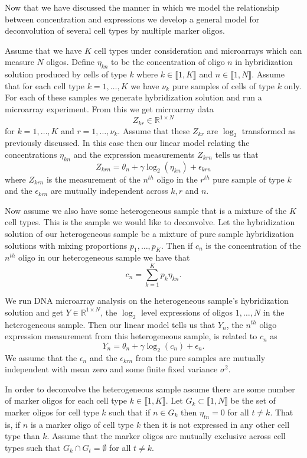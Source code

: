 \documentclass[reqno,12pt,oneside]{report}\usepackage[]{graphicx}\usepackage[]{color}
\theoremstyle{plain}
\theoremstyle{definition}
\theoremstyle{remark}
\numberwithin{theorem}{chapter}     %
\begin{document}
Now that we have discussed the manner in which we model the relationship between concentration and expressions we  develop a general model for deconvolution of several cell types by multiple marker oligos. 

Assume that we have $K$ cell types under consideration and microarrays which can measure $N$ oligos. Define $\eta_{kn}$ to be the concentration of oligo $n$ in hybridization solution produced by cells of type $k$ where $k\in\llbracket 1,K\rrbracket$ and $n\in\llbracket 1,N\rrbracket$. Assume that for each cell type $k=1,\ldots,K$ we have $\nu_k$ pure samples of cells of type $k$ only. For each of these samples we generate hybridization solution and run a microarray experiment. From this we get microarray data 
\[
Z_{kr} \in \mathbb{R}^{1\times N}
\]
for $k=1,\ldots,K$ and $r=1,\ldots,\nu_k$. Assume that these $Z_{kr}$ are $\log_2$ transformed as previously discussed. In this case then our linear model relating the concentrations $\eta_{kn}$ and the expression measurements $Z_{krn}$ tells us that
\[
Z_{krn} = \theta_n + \gamma \log_2\left(\eta_{kn}\right)+\epsilon_{krn}
\]
where $Z_{krn}$ is the measurement of the $n^{th}$ oligo in the $r^{th}$ pure sample of type $k$ and the $\epsilon_{krn}$ are mutually independent across $k,r$ and $n$.

Now assume we also have some heterogeneous sample that is a mixture of the $K$ cell types. This is the sample we would like to deconvolve. Let the hybridization solution of our heterogeneous sample be a mixture of pure sample hybridization solutions with mixing proportions $p_1,\ldots,p_K$. Then if $c_n$ is the concentration of the $n^{th}$ oligo in our heterogeneous sample we have that 
\[
c_n = \sum_{k=1}^{K}p_k\eta_{kn}.
\]

We run DNA microarray analysis on the heterogeneous sample's hybridization solution and get $Y\in\mathbb{R}^{1\times N}$, the $\log_2$ level expressions of oligos $1,\ldots,N$ in the heterogeneous sample. Then our linear model tells us that $Y_n$, the $n^{th}$ oligo expression measurement from this heterogeneous sample, is related to $c_n$ as
\[
Y_n = \theta_n + \gamma\log_2\left(c_n\right)+\epsilon_n.
\]
We assume that the $\epsilon_n$ and the $\epsilon_{krn}$ from the pure samples are mutually independent with mean zero and some finite fixed variance $\sigma^2$.

In order to deconvolve the heterogeneous sample assume there are some number of marker oligos for each cell type $k\in\llbracket1, K\rrbracket$. Let $G_k\subset\llbracket 1, N\rrbracket$ be the set of marker oligos for cell type $k$ such that if $n \in G_k$ then $\eta_{tn}=0$ for all $t \neq k$. That is, if $n$ is a marker oligo of cell type $k$ then it is not expressed in any other cell type than $k$. Assume that the marker oligos are mutually exclusive across cell types such that $G_k\cap G_t=\emptyset$ for all $t \neq k$. 
\end{document}
